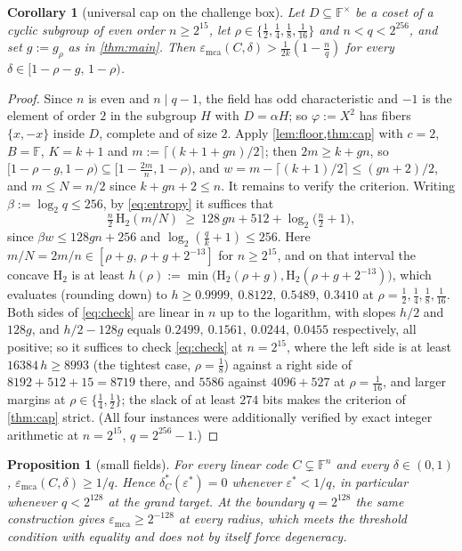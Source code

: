 \documentclass[11pt]{amsart}
\newtheorem{proposition}[proposition]{Proposition}
\newtheorem{corollary}[corollary]{Corollary}
\theoremstyle{definition}
\theoremstyle{remark}
\newcommand{\F}{\mathbb{F}}
\newcommand{\emca}{\varepsilon_{\mathrm{mca}}}
\newcommand{\Hb}{\mathrm{H}_2}
\begin{document}
\begin{corollary}[universal cap on the challenge box]\label{cor:envelope}
Let $D\subseteq\F^\times$ be a coset of a cyclic subgroup of even order $n\ge2^{15}$, let $\rho\in\{\tfrac12,\tfrac14,\tfrac18,\tfrac1{16}\}$ and $n<q<2^{256}$, and set $g:=g_\rho$ as in \cref{thm:main}. Then $\emca(C,\delta)>\frac1{2k}(1-\frac nq)$ for every $\delta\in[1-\rho-g,\,1-\rho)$.
\end{corollary}

\begin{proof}
Since $n$ is even and $n\mid q-1$, the field has odd characteristic and $-1$ is the element of order $2$ in the subgroup $H$ with $D=\alpha H$; so $\varphi:=X^2$ has fibers $\{x,-x\}$ inside $D$, complete and of size $2$. Apply \cref{lem:floor,thm:cap} with $c=2$, $B=\F$, $K=k+1$ and $m:=\lceil(k+1+gn)/2\rceil$; then $2m\ge k+gn$, so $[1-\rho-g,1-\rho)\subseteq[1-\frac{2m}n,1-\rho)$, and $w=m-\lceil(k+1)/2\rceil\le(gn+2)/2$, and $m\le N=n/2$ since $k+gn+2\le n$. It remains to verify the criterion. Writing $\beta:=\log_2q\le256$, by \eqref{eq:entropy} it suffices that
\begin{equation}\label{eq:check}
\tfrac n2\,\Hb(m/N)\ \ge\ 128\,gn+512+\log_2\bigl(\tfrac n2+1\bigr),
\end{equation}
since $\beta w\le128gn+256$ and $\log_2(\frac qk+1)\le256$. Here $m/N=2m/n\in[\rho+g,\,\rho+g+2^{-13}]$ for $n\ge2^{15}$, and on that interval the concave $\Hb$ is at least $h(\rho):=\min\bigl(\Hb(\rho+g),\Hb(\rho+g+2^{-13})\bigr)$, which evaluates (rounding down) to $h\ge0.9999,\ 0.8122,\ 0.5489,\ 0.3410$ at $\rho=\tfrac12,\tfrac14,\tfrac18,\tfrac1{16}$. Both sides of \eqref{eq:check} are linear in $n$ up to the logarithm, with slopes $h/2$ and $128g$, and $h/2-128g$ equals $0.2499,\ 0.1561,\ 0.0244,\ 0.0455$ respectively, all positive; so it suffices to check \eqref{eq:check} at $n=2^{15}$, where the left side is at least $16384\,h\ge8993$ (the tightest case, $\rho=\tfrac18$) against a right side of $8192+512+15=8719$ there, and $5586$ against $4096+527$ at $\rho=\tfrac1{16}$, and larger margins at $\rho\in\{\tfrac14,\tfrac12\}$; the slack of at least $274$ bits makes the criterion of \cref{thm:cap} strict. (All four instances were additionally verified by exact integer arithmetic at $n=2^{15}$, $q=2^{256}-1$.)
\end{proof}

\begin{proposition}[small fields]\label{prop:degenerate}
For every linear code $C\subsetneq\F^n$ and every $\delta\in(0,1)$, $\emca(C,\delta)\ge1/q$. Hence $\delta^*_C(\varepsilon^*)=0$ whenever $\varepsilon^*<1/q$, in particular whenever $q<2^{128}$ at the grand target. At the boundary $q=2^{128}$ the same construction gives $\emca\ge2^{-128}$ at every radius, which meets the threshold condition with equality and does not by itself force degeneracy.
\end{proposition}
\end{document}
